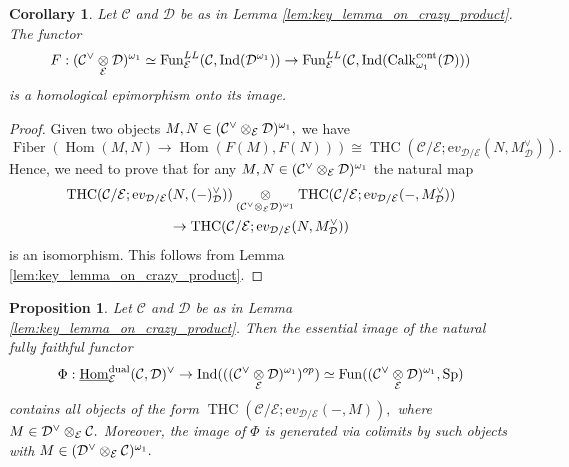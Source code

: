 \documentclass[11pt,leqno]{amsart}
\newtheorem{prop}[theo]{Proposition}
\newtheorem{cor}[theo]{Corollary}
\numberwithin{equation}{section}
\def\Hom{\operatorname{Hom}}
\newcommand{\tens}[1]{%
  \mathbin{\mathop{\otimes}\displaylimits_{#1}}%
}
\newcommand{\Fiber}{\operatorname{Fiber}}
\newcommand{\cont}{\operatorname{cont}}
\newcommand{\dual}{\operatorname{dual}}
\newcommand{\ev}{\mathrm ev}
\newcommand{\cD}{{\mathcal D}}
\newcommand{\cC}{{\mathcal C}}
\newcommand{\cE}{{\mathcal E}}
\newcommand{\un}{\underline}
\newcommand{\THC}{\operatorname{THC}}
\newcommand{\Fun}{\operatorname{Fun}}
\newcommand{\Sp}{\operatorname{Sp}}
\newcommand{\Ind}{\operatorname{Ind}}
\newcommand{\Calk}{\operatorname{Calk}}
\begin{document}
\begin{cor}\label{cor:hom_epi_onto_the_image} Let $\cC$ and $\cD$ be as in Lemma \ref{lem:key_lemma_on_crazy_product}. The functor \begin{equation*}
F:(\cC^{\vee}\tens{\cE}\cD)^{\omega_1}\simeq \Fun_{\cE}^{LL}(\cC,\Ind(\cD^{\omega_1}))\to \Fun_{\cE}^{LL}(\cC,\Ind(\Calk^{\cont}_{\omega_1}(\cD)))	
\end{equation*}
is a homological epimorphism onto its image.
\end{cor}

\begin{proof}
Given two objects $M,N\in (\cC^{\vee}\tens{\cE}\cD)^{\omega_1},$ we have
$$\Fiber(\Hom(M,N)\to \Hom(F(M),F(N)))\cong \THC(\cC/\cE;\ev_{\cD/\cE}(N,M_{\cD}^{\vee})).$$
Hence, we need to prove that for any $M,N\in (\cC^{\vee}\tens{\cE}\cD)^{\omega_1}$ the natural map
\begin{multline*}
\THC(\cC/\cE;\ev_{\cD/\cE}(N,(-)_{\cD}^{\vee}))\tens{(\cC^{\vee}\tens{\cE}\cD)^{\omega_1}} \THC(\cC/\cE;\ev_{\cD/\cE}(-,M_{\cD}^{\vee}))\\
\to \THC(\cC/\cE;\ev_{\cD/\cE}(N,M_{\cD}^{\vee}))
\end{multline*}
is an isomorphism. This follows from Lemma \ref{lem:key_lemma_on_crazy_product}.
\end{proof}

\begin{prop}\label{prop:dual_of_internal_Hom}Let $\cC$ and $\cD$ be as in Lemma \ref{lem:key_lemma_on_crazy_product}. Then the essential image of the natural fully faithful functor
\begin{equation*}
\Phi:\un{\Hom}_{\cE}^{\dual}(\cC,\cD)^{\vee}\to \Ind(((\cC^{\vee}\tens{\cE}\cD)^{\omega_1})^{op})\simeq \Fun((\cC^{\vee}\tens{\cE}\cD)^{\omega_1},\Sp)  
\end{equation*}
contains all objects of the form $\THC(\cC/\cE;\ev_{\cD/\cE}(-,M)),$ where $M\in\cD^{\vee}\tens{\cE}\cC.$ Moreover, the image of $\Phi$ is generated via colimits by such objects with $M\in (\cD^{\vee}\tens{\cE}\cC)^{\omega_1}.$
\end{prop}
\end{document}
